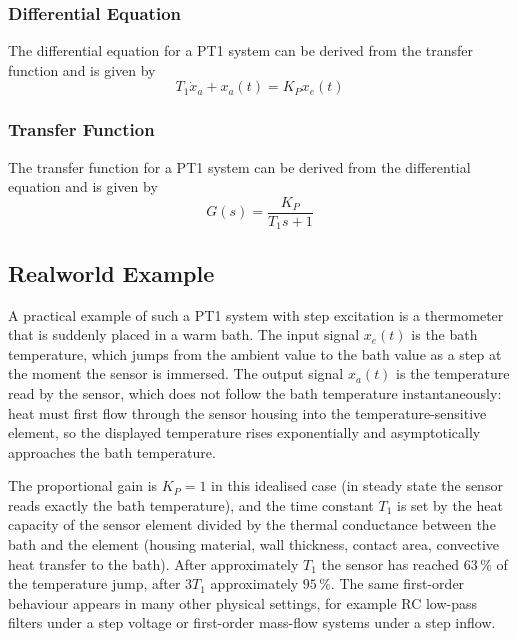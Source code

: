 \documentclass[12pt, oneside, a4paper]{scrreprt}
\begin{document}
                \subsubsection{Differential Equation}
                    The differential equation for a PT1 system can be derived from the transfer function and is given by
                    \begin{equation}
                        T_1 \dot{x}_a + x_a(t) = K_P x_e(t)
                    \end{equation}

                \subsubsection{Transfer Function}
                    The transfer function for a PT1 system can be derived from the differential equation and is given by
                    \begin{equation}
                        G(s) = \frac{K_P}{T_1 s + 1}
                    \end{equation}

            \subsection{Realworld Example}

                A practical example of such a PT1 system with step excitation is a thermometer that is suddenly placed in a warm bath. The input signal $x_e(t)$ is the bath temperature, which jumps from the ambient value to the bath value as a step at the moment the sensor is immersed. The output signal $x_a(t)$ is the temperature read by the sensor, which does not follow the bath temperature instantaneously: heat must first flow through the sensor housing into the temperature-sensitive element, so the displayed temperature rises exponentially and asymptotically approaches the bath temperature.

                The proportional gain is $K_P = 1$ in this idealised case (in steady state the sensor reads exactly the bath temperature), and the time constant $T_1$ is set by the heat capacity of the sensor element divided by the thermal conductance between the bath and the element (housing material, wall thickness, contact area, convective heat transfer to the bath). After approximately $T_1$ the sensor has reached $63\,\%$ of the temperature jump, after $3 T_1$ approximately $95\,\%$. The same first-order behaviour appears in many other physical settings, for example RC low-pass filters under a step voltage or first-order mass-flow systems under a step inflow.
\end{document}
